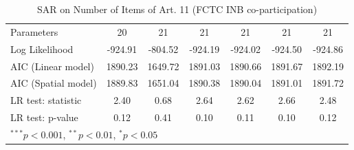 \begin{table}[!h]
\begin{center}
\begin{tabular}{l c c c c c c }
Parameters              & 20           & 21           & 21           & 21           & 21           & 21           \\
Log Likelihood          & -924.91      & -804.52      & -924.19      & -924.02      & -924.50      & -924.86      \\
AIC (Linear model)      & 1890.23      & 1649.72      & 1891.03      & 1890.66      & 1891.67      & 1892.19      \\
AIC (Spatial model)     & 1889.83      & 1651.04      & 1890.38      & 1890.04      & 1891.01      & 1891.72      \\
LR test: statistic      & 2.40         & 0.68         & 2.64         & 2.62         & 2.66         & 2.48         \\
LR test: p-value        & 0.12         & 0.41         & 0.10         & 0.11         & 0.10         & 0.12         \\
\bottomrule
\multicolumn{7}{l}{\scriptsize{$^{***}p<0.001$, $^{**}p<0.01$, $^*p<0.05$}}
\end{tabular}
\caption{SAR on Number of Items of Art. 11 (FCTC INB co-participation)}
\label{table:coefficients}
\end{center}
\end{table}
